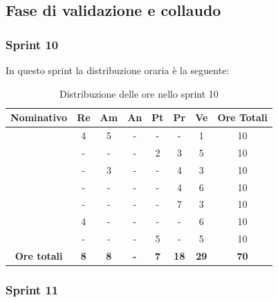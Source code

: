 \subsection{Fase di validazione e collaudo}

\subsubsection{Sprint 10}

In questo sprint la distribuzione oraria è la seguente:
\begin{table}[H]
		\begin{center}
			\setlength{\aboverulesep}{0pt}
			\setlength{\belowrulesep}{0pt}
			\setlength{\extrarowheight}{.75ex}
			\begin{tabular}{ c c c c c c c c }
				\rowcolor{AzzurroGruppo!30} 
				\textbf{Nominativo} & \textbf{Re} & \textbf{Am} & \textbf{An} & \textbf{Pt} & \textbf{Pr} & \textbf{Ve} & \textbf{Ore Totali}  \\
				\toprule
				\Davide    & 4 & 5 & - & - & - & 1 & 10 \\
				\Giosue    & - & - & - & 2 & 3 & 5 & 10 \\
				\Francesco & - & 3 & - & - & 4 & 3 & 10\\
				\Daniele   & - & - & - & - & 4 & 6 & 10\\
				\Lucrezia  & - & - & - & - & 7 & 3 & 10\\
				\Matteo    & 4 & - & - & - & - & 6 & 10\\
				\Tommaso   & - & - & - & 5 & - & 5 & 10\\
				 \textbf{Ore totali} & \textbf{8} & \textbf{8} & \textbf{-} & \textbf{7} & \textbf{18} & \textbf{29} & \textbf{70} \\
				\bottomrule
			\end{tabular}
			\caption{Distribuzione delle ore nello sprint 10}
		\end{center}
	\end{table}


\subsubsection{Sprint 11}


